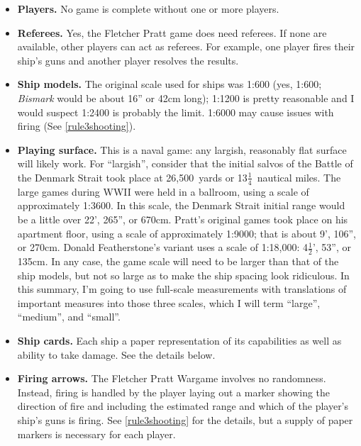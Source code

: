 \documentclass[twocolumn]{article}
\begin{document}
\begin{itemize}
\item \textbf{Players.}
  No game is complete without one or more players.
\item \textbf{Referees.}
  Yes, the Fletcher Pratt game does need referees. If none are
  available, other players can act as referees. For example, one player
  fires their ship's guns and another player resolves the results.
\item \textbf{Ship models.}
  The original scale used for ships was 1:600 (yes, 1:600; \emph{Bismark}
  would be about 16'' or 42cm long); 1:1200 is pretty reasonable and I
  would suspect 1:2400 is probably the limit. 1:6000 may cause issues
  with firing (See \autoref{rule3shooting}).
\item \textbf{Playing surface.}
  This is a naval game: any largish, reasonably flat surface will
  likely work. For ``largish'', consider that the initial salvos of
  the Battle of the Denmark Strait took place at 26,500~yards or
  13$\frac{1}{4}$~nautical miles. The large games during WWII were
  held in a ballroom, using a scale of approximately 1:3600. In this
  scale, the Denmark Strait initial range would be a little over 22',
  265'', or 670cm. Pratt's original games took place on his apartment
  floor, using a scale of approximately 1:9000; that is about 9', 106'',
  or 270cm. Donald Featherstone's variant uses a scale of 1:18,000:
  4$\frac{1}{2}$', 53'', or 135cm. In any case, the game scale will need
  to be larger than that of the ship models, but not so large as to make
  the ship spacing look ridiculous. In this summary, I'm going to use
  full-scale measurements with translations of important measures
  into those three scales, which I will term ``large'', ``medium'', and
  ``small''.
\item \textbf{Ship cards.}
  Each ship a paper representation of its capabilities as well as
  ability to take damage. See the details below.
\item \textbf{Firing arrows.}
  The Fletcher Pratt Wargame involves no randomness. Instead, firing
  is handled by the player laying out a marker showing the direction
  of fire and including the estimated range and which of the player's
  ship's guns is firing. See \autoref{rule3shooting} for the details,
  but a supply of paper markers is necessary for each player.


\end{itemize}
\end{document}
